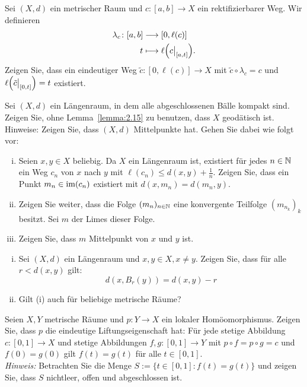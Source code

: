 	\begin{aufgabe}
		\label{aufg:4.3}	
		Sei $(X,d)$ ein metrischer Raum und $c \colon [a,b] \rightarrow X$ ein rektifizierbarer Weg.
		Wir definieren
		\begin{align*}
			\lambda_c \colon [a,b] &\longrightarrow [0,\ell(c)] \\
			t &\longmapsto \ell\enbrace*{c \big|_{[a,t]}}.
		\end{align*}
		Zeigen Sie, dass ein eindeutiger Weg $\tilde{c}\colon [0,\ell(c)] \rightarrow X$ mit $\tilde{c} \circ \lambda_c = c$ und $\ell\enbrace*{\tilde{c}\big|_{[0,t]}} = t$ existiert.
	\end{aufgabe}
	
	\begin{aufgabe}
		\label{aufg:4.4}	
		Sei $(X,d)$ ein Längenraum, in dem alle abgeschlossenen Bälle kompakt sind.
		Zeigen Sie, ohne Lemma~\ref{lemma:2.15} zu benutzen, dass $X$ geodätisch ist. \\
		Hinweise: Zeigen Sie, dass $(X,d)$ Mittelpunkte hat.
		Gehen Sie dabei wie folgt vor:
		\begin{enumerate}[(i)]
			\item Seien $x,y \in X$ beliebig.
			Da $X$ ein Längenraum ist, existiert für jedes $n \in \mathbb{N}$ ein Weg $c_n$ von $x$ nach $y$ mit $\ell(c_n) \leq d(x,y) + \frac{1}{n}$.
			Zeigen Sie, dass ein Punkt $m_n \in \operatorname{im}(c_n)$ existiert mit $d(x,m_n) = d(m_n,y)$.
			\item Zeigen Sie weiter, dass die Folge $(m_n)_{n \in \mathbb{N}}$ eine konvergente Teilfolge $(m_{n_k})_k$ besitzt.
			Sei $m$ der Limes dieser Folge.
			\item Zeigen Sie, dass $m$ Mittelpunkt von $x$ und $y$ ist.
		\end{enumerate}
	\end{aufgabe}
	
	\begin{aufgabe}
		\label{aufg:5.1}	
		\begin{enumerate}[(i)]
			\item Sei $(X,d)$ ein Längenraum und $x,y \in X, x \neq y$.
			Zeigen Sie, dass für alle $r < d(x,y)$ gilt:
			\[
				d(x,B_r(y)) = d(x,y) - r
			\]
			\item Gilt (i) auch für beliebige metrische Räume?
		\end{enumerate}
	\end{aufgabe}
	
	\begin{aufgabe}
		\label{aufg:5.2}	
		Seien $X,Y$ metrische Räume und $p \colon Y \rightarrow X$ ein lokaler Homöomorphismus.
		Zeigen Sie, dass $p$ die eindeutige Liftungseigenschaft hat:
		Für jede stetige Abbildung $c \colon [0,1] \rightarrow X$ und stetige Abbildungen $f,g \colon [0,1] \rightarrow Y$ mit $p \circ f = p \circ g = c$ und $f(0) = g(0)$ gilt $f(t) = g(t)$ für alle $t \in [0,1]$. \\
		\textit{Hinweis:} Betrachten Sie die Menge $S:= \{t \in [0,1] : f(t) = g(t)\}$ und zeigen Sie, dass $S$ nichtleer, offen und abgeschlossen ist.
	\end{aufgabe}
	
